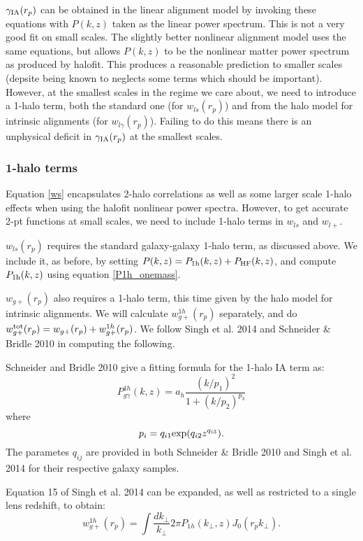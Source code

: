 \documentclass[onecolumn,amsmath,aps,fleqn, superscriptaddress]{revtex4}
\begin{document}
$\gamma_{\rm IA}(r_p)$ can be obtained in the linear alignment model by invoking these equations with $P(k,z)$ taken as the linear power spectrum. This is not a very good fit on small scales. The slightly better nonlinear alignment model uses the same equations, but allows $P(k,z)$ to be the nonlinear matter power spectrum as produced by halofit. This produces a reasonable prediction to smaller scales (depsite being known to neglects some terms which should be important). However, at the smallest scales in the regime we care about, we need to introduce a 1-halo term, both the standard one (for $w_{ls}(r_p)$) and from the halo model for intrinsic alignments (for $w_{l\gamma}(r_p)$). Failing to do this means there is an unphysical deficit in $\gamma_{\rm IA}(r_p)$ at the smallest scales.

\subsubsection*{1-halo terms}
Equation \ref{ws} encapsulates 2-halo correlations as well as some larger scale 1-halo effects when using the halofit nonlinear power spectra. However, to get accurate 2-pt functions at small scales, we need to include 1-halo terms in $w_{ls}$ and $w_{l+}$. 

$w_{ls}(r_p)$ requires the standard galaxy-galaxy 1-halo term, as discussed above. We include it, as before, by setting $P(k,z) = P_{\rm 1h}(k,z) + P_{\rm HF}(k,z)$, and compute $P_{\rm 1h}(k,z)$ using equation \ref{P1h_onemass}. 

$w_{g+}(r_p)$ also requires a 1-halo term, this time given by the halo model for intrinsic alignments. We will calculate $w_{g+}^{1h}(r_p)$ separately, and do $w_{g+}^{\rm tot}(r_p) = w_{g+}(r_p) + w_{g+}^{1h}(r_p)$. We follow Singh et al. 2014 and Schneider \& Bridle 2010 in computing the following.

Schneider and Bridle 2010 give a fitting formula for the 1-halo IA term as:
\begin{equation}
P^{1h}_{g\gamma}(k,z) = a_h \frac{(k/p_1)^2}{1+ (k/p_2)^{p_3}}
\label{P1hIA}
\end{equation}
where
\begin{equation}
p_i = q_{i1} {\rm exp}(q_{i2} z^{q_{i3}}).
\label{pi}
\end{equation}
The parametes $q_{ij}$ are provided in both Schneider \& Bridle 2010 and Singh et al. 2014 for their respective galaxy samples.

Equation 15 of Singh et al. 2014 can be expanded, as well as restricted to a single lens redshift, to obtain:
\begin{equation}
w_{g+}^{1h}(r_p) = \int \frac{dk_\perp}{k_\perp}{2\pi} P_{1h}(k_\perp,z) J_0(r_p k_\perp).
\label{wg1h}
\end{equation}
\end{document}
